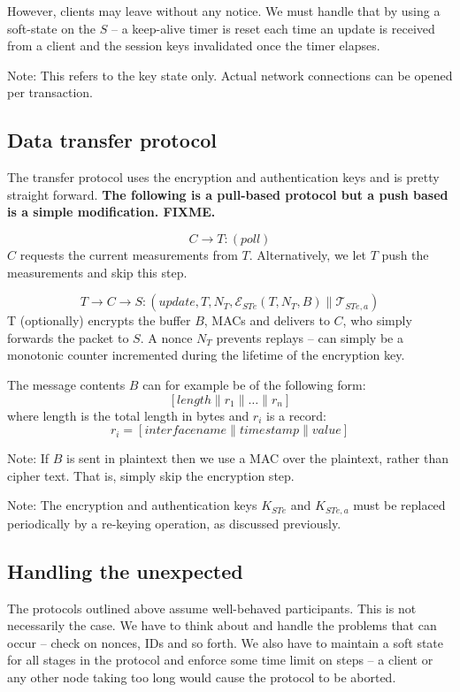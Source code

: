 However, clients may leave without any notice. We must handle that by using a soft-state on the $S$ -- a keep-alive timer is reset each time an update is received from a client and the session keys invalidated once the timer elapses.

Note: This refers to the key state only. Actual network connections can be opened per transaction.

\subsection{Data transfer protocol}

The transfer protocol uses the encryption and authentication keys and is pretty straight forward. \textbf{The following is a pull-based protocol but a push based is a simple modification. FIXME.}

\[
C \rightarrow T: (\textit{poll})
\]
$C$ requests the current measurements from $T$. Alternatively, we let $T$ push the measurements and skip this step.

\[
T \rightarrow C \rightarrow S: (\textit{update},T,N_T,\mathcal{E}_{STe}(T,N_T,B) \parallel \mathcal{T}_{STe,a})
\]
T (optionally) encrypts the buffer $B$, MACs and delivers to $C$, who simply forwards the packet to $S$. A nonce $N_T$ prevents replays -- can simply be a monotonic counter incremented during the lifetime of the encryption key.

The message contents $B$ can for example be of the following form:
\[
[length \parallel r_1 \parallel \dots \parallel r_n ]
\]
where length is the total length in bytes and $r_i$ is a record:
\[
r_i = [interface name \parallel timestamp \parallel value ]
\]

Note: If $B$ is sent in plaintext then we use a MAC over the plaintext, rather than cipher text. That is, simply skip the encryption step.

Note: The encryption and authentication keys $K_{STe}$ and $K_{STe,a}$ must be replaced periodically by a re-keying operation, as discussed previously.

\subsection{Handling the unexpected}

The protocols outlined above assume well-behaved participants. This is not necessarily the case. We have to think about and handle the problems that can occur -- check on nonces, IDs and so forth. We also have to maintain a soft state for all stages in the protocol and enforce some time limit on steps -- a client or any other node taking too long would cause the protocol to be aborted.

